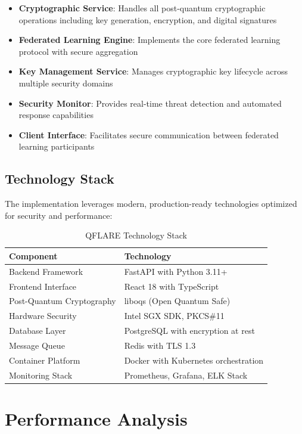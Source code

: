 \documentclass[12pt,a4paper,twoside]{book}
\begin{document}
\begin{itemize}
\item \textbf{Cryptographic Service}: Handles all post-quantum cryptographic operations including key generation, encryption, and digital signatures
\item \textbf{Federated Learning Engine}: Implements the core federated learning protocol with secure aggregation
\item \textbf{Key Management Service}: Manages cryptographic key lifecycle across multiple security domains
\item \textbf{Security Monitor}: Provides real-time threat detection and automated response capabilities
\item \textbf{Client Interface}: Facilitates secure communication between federated learning participants
\end{itemize}

\subsection{Technology Stack}
\label{subsec:tech-stack}

The implementation leverages modern, production-ready technologies optimized for security and performance:

\begin{table}[htbp]
\centering
\caption{QFLARE Technology Stack}
\label{tab:tech-stack}
\begin{tabular}{@{}ll@{}}
\toprule
Component & Technology \\
\midrule
Backend Framework & FastAPI with Python 3.11+ \\
Frontend Interface & React 18 with TypeScript \\
Post-Quantum Cryptography & liboqs (Open Quantum Safe) \\
Hardware Security & Intel SGX SDK, PKCS\#11 \\
Database Layer & PostgreSQL with encryption at rest \\
Message Queue & Redis with TLS 1.3 \\
Container Platform & Docker with Kubernetes orchestration \\
Monitoring Stack & Prometheus, Grafana, ELK Stack \\
\bottomrule
\end{tabular}
\end{table}

\section{Performance Analysis}
\label{sec:performance-analysis}
\end{document}
